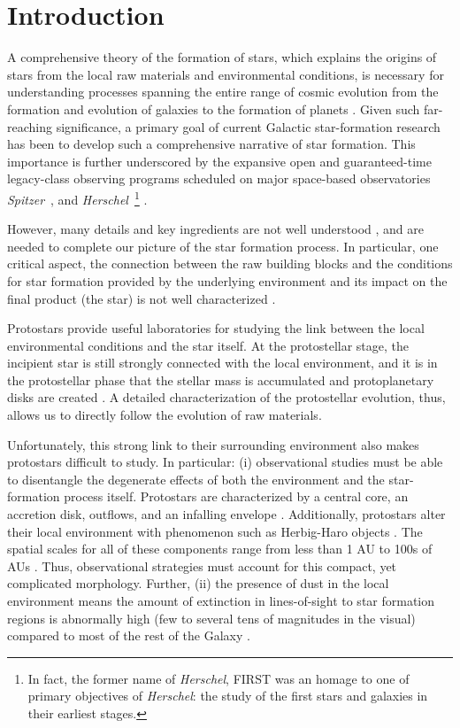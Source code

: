 \documentclass[manuscript]{aastex61}
\newcommand{\herschel}{{\em Herschel}}
\newcommand{\spitzer}{{\em Spitzer}}
\begin{document}

\section{Introduction}
\par
A comprehensive theory of the formation of stars, which explains the origins of stars from the local raw materials and environmental conditions, is necessary for understanding processes spanning the entire range of cosmic evolution from the formation and evolution of galaxies to the formation of planets \citep{ke2012}.  Given such far-reaching significance, a primary goal of current Galactic star-formation research has been to develop such a comprehensive narrative of star formation.  This importance is further underscored by the expansive open and guaranteed-time legacy-class observing programs scheduled on major space-based observatories \spitzer\ \citep{spitzer}, and \herschel\ \footnote{In fact, the former name of \herschel, FIRST was an homage to one of primary objectives of \herschel: the study of the first stars and galaxies in their earliest stages.} \citep{herschel}.
\par
However, many details and key ingredients  are not well understood \citep{mo07}, and are needed to complete our picture of the star formation process.  In particular, one critical aspect, the connection between the raw building blocks and the conditions for star formation provided by the underlying environment and its impact on the final product (the star) is not well characterized \citep{dunham}.
\par
Protostars provide useful laboratories for studying the link between the local environmental conditions and the star itself.  At the protostellar stage, the incipient star is still strongly connected with the local environment, and it is in the protostellar phase that the stellar mass is accumulated and protoplanetary disks are created \citep{c2d09}.  A detailed characterization of the protostellar evolution, thus, allows us to directly follow the evolution of raw materials.
\par
Unfortunately, this strong link to their surrounding environment also makes protostars difficult to study.  In particular:  (i) observational studies must be able to disentangle the degenerate effects of both the environment and the star-formation process itself.  Protostars are characterized by a central core, an accretion disk, outflows, and an infalling envelope \citep{ali}. Additionally, protostars alter their local environment with phenomenon such as Herbig-Haro objects \citep{hhobjects}.  The spatial scales for all of these components range from less than 1 AU to 100s of AUs \citep{mo07}.  Thus, observational strategies must account for this compact, yet complicated morphology.  Further, (ii) the presence of dust in the local environment means the amount of extinction in lines-of-sight to star formation regions is abnormally high (few to several tens of magnitudes in the visual) compared to most of the rest of the Galaxy \citep{dobbs}.
\end{document}
